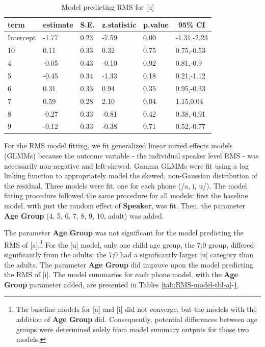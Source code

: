 \documentclass[
]{article}
\begin{document}
\begin{table}[tbp]

\begin{center}
\begin{threeparttable}

\caption{\label{tab:RMS-model-tbl-u}Model predicting RMS for [u]}

\begin{tabular}{llllll}
\toprule
term & \multicolumn{1}{c}{estimate} & \multicolumn{1}{c}{S.E.} & \multicolumn{1}{c}{z.statistic} & \multicolumn{1}{c}{p.value} & \multicolumn{1}{c}{95\% CI}\\
\midrule
Intercept & -1.77 & 0.23 & -7.59 & 0.00 & -1.31,-2.23\\
10 & 0.11 & 0.33 & 0.32 & 0.75 & 0.75,-0.53\\
4 & -0.05 & 0.43 & -0.10 & 0.92 & 0.81,-0.9\\
5 & -0.45 & 0.34 & -1.33 & 0.18 & 0.21,-1.12\\
6 & 0.31 & 0.33 & 0.94 & 0.35 & 0.95,-0.33\\
7 & 0.59 & 0.28 & 2.10 & 0.04 & 1.15,0.04\\
8 & -0.27 & 0.33 & -0.81 & 0.42 & 0.38,-0.91\\
9 & -0.12 & 0.33 & -0.38 & 0.71 & 0.52,-0.77\\
\bottomrule
\end{tabular}

\end{threeparttable}
\end{center}

\end{table}

For the RMS model fitting, we fit generalized linear mixed effects models (GLMMs) because the outcome variable - the individual speaker level RMS - was necessarily non-negative and left-skewed. Gamma GLMMs were fit using a log linking function to appropriately model the skewed, non-Gaussian distribution of the residual. Three models were fit, one for each phone (/a, i, u/). The model fitting procedure followed the same procedure for all models: first the baseline model, with just the random effect of \textbf{Speaker}, was fit. Then, the parameter \textbf{Age Group} (4, 5, 6, 7, 8, 9, 10, adult) was added.

The parameter \textbf{Age Group} was not significant for the model predicting the RMS of {[}a{]}.\footnote{The baseline models for {[}a{]} and {[}i{]} did not converge, but the models with the addition of \textbf{Age Group} did. Consequently, potential differences between age groups were determined solely from model summary outputs for those two models.} For the {[}u{]} model, only one child age group, the 7;0 group, differed significantly from the adults: the 7;0 had a significantly larger {[}u{]} category than the adults. The parameter \textbf{Age Group} did improve upon the model predicting the RMS of {[}i{]}. The model summaries for each phone model, with the \textbf{Age Group} parameter added, are presented in Tables \ref{tab:RMS-model-tbl-a}-\ref{tab:RMS-model-tbl-u}.
\end{document}
